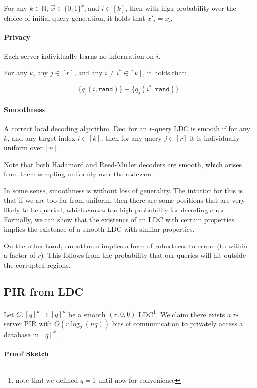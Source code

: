 \documentclass{idc_msc}
\DeclareMathOperator*{\Dec}{Dec}
\begin{document}
For any \(k \in \mathbb{N}\), \(\vec{x} \in \{0,1\}^k\), and \(i \in [k]\), then with high probability over the choice of initial query generation, it holds that \(x'_i = x_i\).

\paragraph{Privacy}

Each server individually learns no information on \(i\).

For any \(k\), any \(j \in [r]\), and any \(i \ne i^* \in [k]\), it holds that:

\[\{q_j(i, \texttt{rand})\} \equiv \{q_j(i^*, \texttt{rand})\}\]

\paragraph{Smoothness}

A correct local decoding algorithm \(\Dec\) for an \(r\)-query LDC is smooth if for any \(k\), and any target index \(i \in [k]\), then for any query \(j \in [r]\) it is individually uniform over \([n]\).

Note that both Hadamard and Reed-Muller decoders are smooth, which arises from them sampling uniformly over the codeword.

In some sense, smoothness is without loss of generality.
The intution for this is that if we are too far from uniform, then there are some positions that are very likely to be queried, which causes too high probability for decoding error.
Formally, we can show that the existence of an LDC with certain properties implies the existence of a smooth LDC with similar properties.

On the other hand, smoothness implies a form of robustness to errors (to within a factor of \(r\)). This follows from the probability that our queries will hit outside the corrupted regions.

\subsection{PIR from LDC}

Let \(C: [q]^k \to [q]^n\) be a smooth \((r,0,0)\) LDC\footnote{note that we defined \(q = 1\) until now for convenience}.
We claim there exists a \(r\)-server PIR with \(O(r \log_2(nq))\) bits of communication to privately access a database in \([q]^k\).

\paragraph{Proof Sketch}
\end{document}
